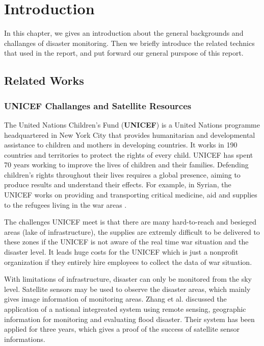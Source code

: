 \section{Introduction}

In this chapter, we gives an introduction about 
the general backgrounds and challanges of disaster monitoring. Then we briefly introduce 
the related technics that used in the report, 
and put forward our general purspose of this report.

\subsection{Related Works}

\subsubsection{UNICEF Challanges and Satellite Resources}

The United Nations Children's Fund (\textbf{UNICEF\label{idx:unicef}}) \cite{unicef1994state} 
is a United Nations programme headquartered
in New York City that provides humanitarian and developmental assistance to 
children and mothers in developing countries.
It works in 190 countries and territories to protect the rights of every child.
UNICEF has spent 70 years working to improve the lives of children and their families. 
Defending children's rights throughout their lives requires a global presence, 
aiming to produce results and understand their effects. 
For example, in Syrian, the UNICEF works on providing and transporting critical medicine, 
aid and supplies to the refugees living in the war areas \cite{unicef2017report}. 

The challenges UNICEF meet is that there are many hard-to-reach and 
besieged areas (lake of infrastructure), the supplies are extremly difficult to be delivered to these zones 
if the UNICEF is not aware of the real time war situation and the disaster level. 
It leads huge costs for the UNICEF 
which is just a nonprofit organization if they entirely hire employees to collect the data of war situation.

With limitations of infrastructure, disaster can only be monitored from the sky level.
Satellite sensors may be used to observe the disaster areas, which mainly gives image information of monitoring areas. 
Zhang et al. \cite{zhang2002flood} discussed the application of a national integreated system using remote sensing, geographic information 
for monitoring and evaluating flood disaster. Their system has been applied for three years, which gives a proof of the success
of satellite sensor informations.

